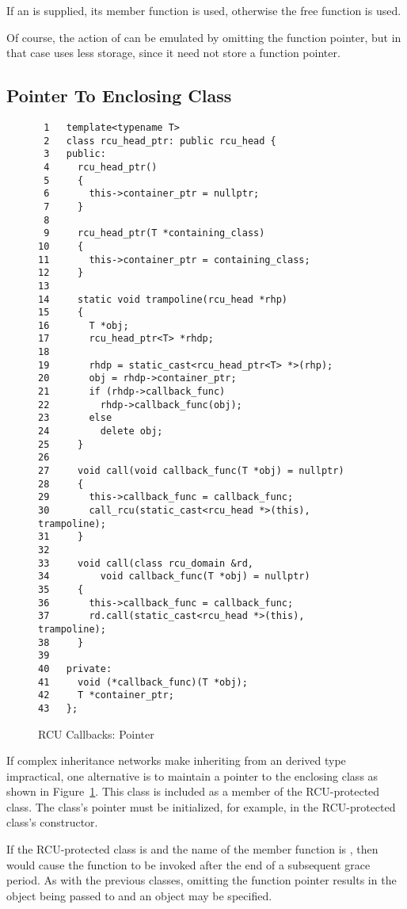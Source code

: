 \documentclass[letterpaper,twocolumn,10pt]{article}
\begin{document}
If an  is supplied, its 
member function is used, otherwise the  free
function is used.

Of course, the action of  can be emulated by
omitting the function pointer, but in that case 
uses less storage, since it need not store a function pointer.

\subsection{Pointer To Enclosing Class}
\label{sec:Pointer To Enclosing Class}

\begin{figure}[tbp]
{ \scriptsize
\begin{verbatim}
 1   template<typename T>
 2   class rcu_head_ptr: public rcu_head {
 3   public:
 4     rcu_head_ptr()
 5     {
 6       this->container_ptr = nullptr;
 7     }
 8
 9     rcu_head_ptr(T *containing_class)
10     {
11       this->container_ptr = containing_class;
12     }
13
14     static void trampoline(rcu_head *rhp)
15     {
16       T *obj;
17       rcu_head_ptr<T> *rhdp;
18
19       rhdp = static_cast<rcu_head_ptr<T> *>(rhp);
20       obj = rhdp->container_ptr;
21       if (rhdp->callback_func)
22         rhdp->callback_func(obj);
23       else
24         delete obj;
25     }
26
27     void call(void callback_func(T *obj) = nullptr)
28     {
29       this->callback_func = callback_func;
30       call_rcu(static_cast<rcu_head *>(this), trampoline);
31     }
32
33     void call(class rcu_domain &rd,
34         void callback_func(T *obj) = nullptr)
35     {
36       this->callback_func = callback_func;
37       rd.call(static_cast<rcu_head *>(this), trampoline);
38     }
39
40   private:
41     void (*callback_func)(T *obj);
42     T *container_ptr;
43   };
\end{verbatim}
}
\caption{RCU Callbacks: Pointer}
\label{fig:RCU Callbacks: Pointer}
\end{figure}

If complex inheritance networks make inheriting from an
 derived type impractical, one alternative is
to maintain a pointer to the enclosing class as shown in
Figure~\ref{fig:RCU Callbacks: Pointer}.
This  class is included as a member of the RCU-protected
class.
The  class's pointer must be initialized, for example,
in the RCU-protected class's constructor.

If the RCU-protected class is  and the name of the
 member function is , then
 would cause the function  to be
invoked after the end of a subsequent grace period.
As with the previous classes, omitting the function pointer results
in the object being passed to  and an 
object may be specified.
\end{document}
